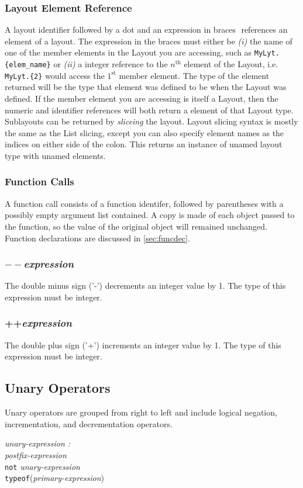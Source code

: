 \documentclass{article}
\begin{document}
\subsubsection{Layout Element Reference}
\label{sec:layoutref}
A layout identifier followed by a dot and an expression in braces ${ }$ references an element of a layout. The expression in the braces must either be \emph{(i)} the name of one of the member elements in the Layout you are accessing, such as \lstinline!MyLyt.{elem_name}! or \emph{(ii)} a integer reference to the $n^\mathrm{th}$ element of the Layout, i.e. \lstinline!MyLyt.{2}! would access the $1^\mathrm{st}$ member element. The type of the element returned will be the type that element was defined to be when the Layout was defined. If the member element you are accessing is itself a Layout, then the numeric and identifier references will both return a element of that Layout type. 
Sublayouts can be returned by \emph{sliceing} the layout. Layout slicing syntax is mostly the same as the List slicing, except you can also specify element names as the indices on either side of the colon. This returns an instance of unamed layout type with unamed elements.

\subsubsection{Function Calls}
A function call consists of a function identifer, followed by parentheses with a possibly empty argument list contained. A copy is made of each object passed to the function, so the value of the original object will remained unchanged. Function declarations are discussed in \ref{sec:funcdec}.

\subsubsection{$--$\emph{expression}}
The double minus sign ('-') decrements an integer value by 1. The type of this expression must be integer.
\subsubsection{++\emph{expression}}
The double plus sign ('+') increments an integer value by 1. The type of this expression must be integer.

\subsection{Unary Operators}
Unary operators are grouped from right to left and include logical negation, incrementation, and decrementation operators.
\begin{tabbing}
	\= \emph{una}\=\emph{ry-expression :} \\
		\> \> \emph{postfix-expression} \\
		\>\> \texttt{not} \emph{unary-expression}\\
		\>\> \texttt{typeof}(\emph{primary-expression})
\end{tabbing}
\end{document}
